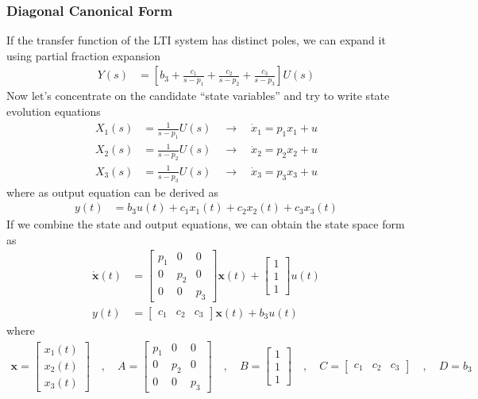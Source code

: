 \documentclass[twoside]{article}
\begin{document}
\subsubsection*{Diagonal Canonical Form}

If the transfer function of the LTI system 
has distinct poles, we can expand it 
using partial fraction expansion 
%
\begin{align*}
Y(s) &= \left[ b_3 + \frac{c_1}{s - p_1} + \frac{c_2}{s - p_2} 
+ \frac{c_3}{s - p_3} \right] U(s)
\end{align*}
%
Now let's concentrate on the candidate ``state variables''
and try to write state evolution equations
%
\begin{align*}
X_1(s) &= \frac{1}{s - p_1} U(s) \quad \rightarrow \quad \dot{x}_1 =  p_1 x_1+ u
\\
X_2(s) &= \frac{1}{s - p_2} U(s) \quad \rightarrow \quad \dot{x}_2 = p_2 x_2+ u
\\
X_3(s) &= \frac{1}{s - p_3} U(s) \quad \rightarrow \quad \dot{x}_3 = p_3 x_3 + u
\end{align*}
%
where as output equation can be derived as
%
\begin{align*}
y(t) &= b_3 u(t) + c_1 x_1(t) + c_2 x_2(t) + c_3 x_3(t)
\end{align*}
%
If we combine the state and output equations, we
can obtain the state space form as
%
%
\begin{align*}
  \dot{\mathbf{x}}(t) &= \left[ \begin{array}{ccc} p_1 & 0 & 0\\ 0 & p_2 & 0
    \\ 0 & 0 & p_3 \end{array} \right] \mathbf{x}(t)
   + 
  \left[ \begin{array}{c} 1 \\ 1
    \\ 1 \end{array} \right] u(t)
\\
y(t) &= \left[ \begin{array}{ccc} c_1 & c_2 & c_3 \end{array} \right] \mathbf{x}(t)
+ b_3 u(t)
\end{align*}
%
where 
%
\begin{align*}
\mathbf{x} = \left[ \begin{array}{c} x_1(t) \\ x_2(t) \\
x_3(t) \end{array} \right] \quad , \quad
A = \left[ \begin{array}{ccc} p_1 & 0 & 0 \\ 0 & p_2 & 0
    \\ 0 & 0 & p_3 \end{array} \right]
\quad , \quad 
B = \left[ \begin{array}{c} 1 \\ 1
    \\ 1 \end{array} \right]
\quad , \quad
C = \left[ \begin{array}{ccc} c_1 & c_2 & c_3 \end{array} \right]
\quad , \quad
D = b_3
\end{align*}
%
\end{document}
